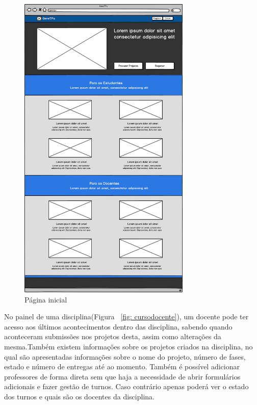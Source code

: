 \begin{figure}[H]
        \centering
        \includegraphics[width=0.73\textwidth]{images/prototipos/mockups/home.png}
         \caption{Página inicial}
         \label{fig: home}
\end{figure}

No painel de uma disciplina(Figura ~\ref{fig: cursodocente}), um docente pode ter acesso aos últimos acontecimentos dentro das disciplina, sabendo quando aconteceram submissões nos projetos desta, assim como alterações da mesma.Também existem informações sobre os projetos criados na disciplina, no qual são apresentadas informações sobre o nome do projeto, número de fases, estado e número de entregas até ao momento. Também é possível adicionar professores de forma direta sem que haja a necessidade de abrir formulários adicionais e fazer gestão de turnos. Caso contrário apenas poderá ver o estado dos turnos e quais são os docentes da disciplina.\\


